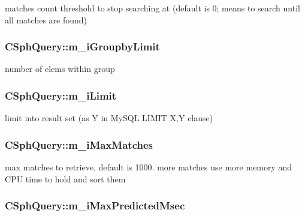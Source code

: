 matches count threshold to stop searching at (default is 0; means to search until all matches are found) 

\hypertarget{classCSphQuery_abdb3ca6adb1e4816a1704b6b7f5f096a}{
\subsubsection[{m\-\_\-i\-Groupby\-Limit}]{ C\-Sph\-Query\-::m\-\_\-i\-Groupby\-Limit}}\label{classCSphQuery_abdb3ca6adb1e4816a1704b6b7f5f096a}


number of elems within group 

\hypertarget{classCSphQuery_a298bca477453ebef5bd1eaef40271b59}{
\subsubsection[{m\-\_\-i\-Limit}]{ C\-Sph\-Query\-::m\-\_\-i\-Limit}}\label{classCSphQuery_a298bca477453ebef5bd1eaef40271b59}


limit into result set (as Y in My\-S\-Q\-L L\-I\-M\-I\-T X,Y clause) 

\hypertarget{classCSphQuery_a3fd20aed8d54fac63b9a3a2b8b0d9065}{
\subsubsection[{m\-\_\-i\-Max\-Matches}]{ C\-Sph\-Query\-::m\-\_\-i\-Max\-Matches}}\label{classCSphQuery_a3fd20aed8d54fac63b9a3a2b8b0d9065}


max matches to retrieve, default is 1000. more matches use more memory and C\-P\-U time to hold and sort them 

\hypertarget{classCSphQuery_a185042a2181d82c8d67b7ef14b399f90}{
\subsubsection[{m\-\_\-i\-Max\-Predicted\-Msec}]{ C\-Sph\-Query\-::m\-\_\-i\-Max\-Predicted\-Msec}}\label{classCSphQuery_a185042a2181d82c8d67b7ef14b399f90}


